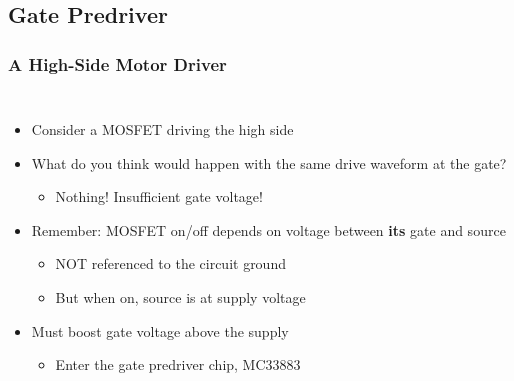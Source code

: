 \documentclass{beamer}
\begin{document}
\subsection{Gate Predriver} %

\begin{frame}
\frametitle{A High-Side Motor Driver}
\begin{columns}[t]
\begin{itemize}
  \item Consider a MOSFET driving the high side
  \item What do you think would happen with the same drive waveform at the gate?
  \begin{itemize}
    \item<2-> Nothing! Insufficient gate voltage!
  \end{itemize}
  \item<2-> Remember: MOSFET on/off depends on voltage between \textbf{its} gate and source
  \begin{itemize}
    \item NOT referenced to the circuit ground
    \item But when on, source is at supply voltage
  \end{itemize}
  \item<2-> Must boost gate voltage above the supply
  \begin{itemize}
    \item Enter the gate predriver chip, MC33883
  \end{itemize}
\end{itemize}


\end{columns}
\end{frame}
\end{document}
